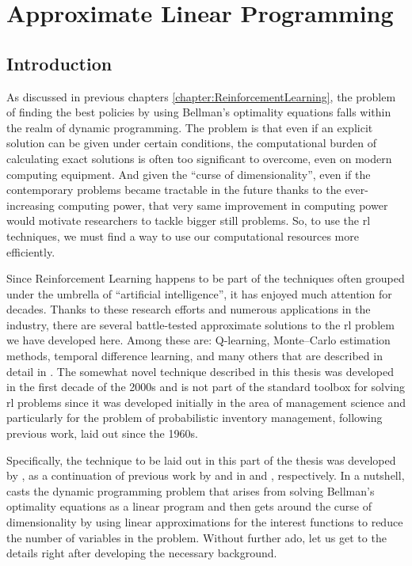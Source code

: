 \chapter{Approximate Linear Programming}
\label{chapter:ApproximateLinearP}
\section{Introduction}

As discussed in previous chapters \ref{chapter:ReinforcementLearning}, the
problem of finding the best policies by using Bellman's optimality equations
falls within the realm of dynamic programming. The problem is that even if an
explicit solution can be given under certain conditions, the computational
burden of calculating exact solutions is often too significant to overcome, even
on modern computing equipment. And given the ``curse of dimensionality'', even
if the contemporary problems became tractable in the future thanks to the
ever-increasing computing power, that very same improvement in computing power
would motivate researchers to tackle bigger still problems. So, to use the
\ac{rl} techniques, we must find a way to use our computational resources more
efficiently. 

Since Reinforcement Learning happens to be part of the techniques often grouped
under the umbrella of ``artificial intelligence'', it has enjoyed much attention
for decades. Thanks to these research efforts and numerous applications in the
industry, there are several battle-tested approximate solutions to the \ac{rl}
problem we have developed here. Among these are: Q-learning, Monte--Carlo
estimation methods, temporal difference learning, and many others that are
described in detail in \cite[Chapter~4]{SuttonBarto}. The somewhat novel
technique described in this thesis was developed in the first decade of the
2000s and is not part of the standard toolbox for solving \ac{rl} problems since
it was developed initially in the area of management science and particularly
for the problem of probabilistic inventory management, following previous work,
laid out since the 1960s. 

Specifically, the technique to be laid out in this part of the thesis was
developed by \citeauthor*{farias2003LP2ADP}, as a continuation of previous work
by \citeauthor*{denardo1970} and \citeauthor*{depenoux1963} in
\cite{denardo1970} and \cite{depenoux1963}, respectively. In a nutshell,
\citeauthor*{farias2002thesis} casts the dynamic programming problem that arises
from solving Bellman's optimality equations as a linear program and then gets
around the curse of dimensionality by using linear approximations for the
interest functions to reduce the number of variables in the problem. Without
further ado, let us get to the details right after developing the necessary
background.

